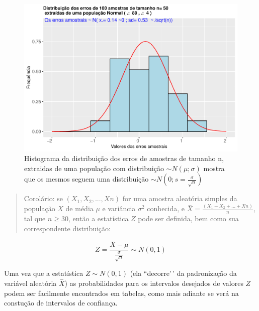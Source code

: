 \documentclass[
]{book}
\begin{document}
\begin{figure}

{\centering \includegraphics[width=1\linewidth]{apostila_files/figure-latex/fig0-2} 

}

\caption{Histograma da distribuição dos erros de amostras de tamanho n,  extraidas de uma população com distribuição $\sim N(\mu; \sigma)$ mostra que os mesmos seguem uma distribuição $\sim N (0; s=\frac{\sigma}{\sqrt{n}})$}\label{fig:fig0-2}
\end{figure}

\hfill\break

\begin{quote}
Corolário: se \((X_{1}, X_{2},...,X{n})\) for uma amostra aleatória simples da população \(X\) de média \(\mu\) e variância \(\sigma^{2}\) conhecida, e \(\stackrel{-}{X}= \frac{(X_{1}+X_{2}+...+X{n})}{n}\), tal que \(n\ge 30\), então a estatística \(Z\) pode ser definida, bem como sua correspondente distribuição:
\end{quote}

\hfill\break

\[
Z = \frac{\stackrel{-}{X} - \mu}{\frac{\sigma}{\sqrt{n}}}  \sim N(0 ,1)
\]

\hfill\break

Uma vez que a estatística \(Z \sim N(0 ,1)\) (ela ``decorre'\,' da padronização da variável aleatória \(\stackrel{-}{X}\)) as probabilidades para os intervalos desejados de valores \(Z\) podem ser facilmente encontrados em tabelas, como mais adiante se verá na constução de intervalos de confiança.

\hfill\break
\end{document}
